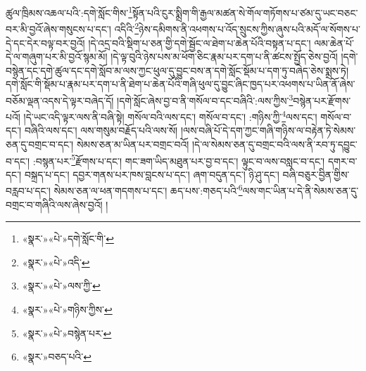 ཚུལ་ཁྲིམས་འཆལ་པའི་:དགེ་སློང་གིས་\footnote{«སྣར་»«པེ་»དགེ་སློང་གི་}སྟོན་པའི་ངུར་སྨྲིག་གི་རྒྱལ་མཚན་སེ་གོལ་གཏོགས་པ་ཙམ་དུ་ཡང་བཅང་བར་མི་བྱའོ་ཞེས་གསུངས་པ་དང་། འདིའི་\footnote{«སྣར་»«པེ་»འདི་}ཉེས་དམིགས་ནི་འཕགས་པ་འོད་སྲུངས་ཀྱིས་ཞུས་པའི་མདོ་ལ་སོགས་པ་དེ་དང་དེར་བལྟ་བར་བྱའོ། །དེ་འདྲ་བའི་སྡིག་པ་ཅན་གྱི་དགེ་སྦྱོང་ལ་ཐེག་པ་ཆེན་པོའི་བསྟན་པ་དང་། ལམ་ཆེན་པོ་དེ་ལ་གཞུག་པར་མི་བྱའོ་སྙམ་མོ། །དེ་ལྟ་བུའི་ཉེས་པས་མ་ཕོག་ཅིང་རྣམ་པར་དག་པ་ནི་ཚངས་སྤྱོད་ཅེས་བྱའོ། །དགེ་བསྙེན་དང་དགེ་ཚུལ་དང་དགེ་སློབ་མ་ལས་ཀྱང་ཕུལ་དུ་བྱུང་བས་ན་དགེ་སློང་སྡོམ་པ་དག་ཏུ་བཞེད་ཅེས་སྨྲས་ཏེ། དགེ་སློང་གི་སྡོམ་པ་རྣམ་པར་དག་པ་ནི་ཐེག་པ་ཆེན་པོའི་གཞི་ཕུལ་དུ་བྱུང་ཞིང་ཁྱད་པར་འཕགས་པ་ཡིན་ནོ་ཞེས་བཅོམ་ལྡན་འདས་དེ་ལྟར་བཞེད་དོ། །དགེ་སློང་ཞེས་བྱ་བ་ནི་གསོལ་བ་དང་བཞིའི་:ལས་ཀྱིས་\footnote{«སྣར་»«པེ་»ལས་ཀྱི་}བསྙེན་པར་རྫོགས་པའོ། །དེ་ཡང་འདི་ལྟར་ལས་ནི་བཞི་སྟེ། གསོལ་བའི་ལས་དང་། གསོལ་བ་དང་། :གཉིས་ཀྱི་\footnote{«སྣར་»«པེ་»གཉིས་ཀྱིས་}ལས་དང་། གསོལ་བ་དང་། བཞིའི་ལས་དང་། ལས་གསུམ་བརྗོད་པའི་ལས་སོ། །ལས་བཞི་པོ་དེ་དག་ཀྱང་གཞི་གཉིས་ལ་བརྟེན་ཏེ་སེམས་ཅན་དུ་བགྲང་བ་དང་། སེམས་ཅན་མ་ཡིན་པར་བགྲང་བའོ། །དེ་ལ་སེམས་ཅན་དུ་བགྲང་བའི་ལས་ནི་རབ་ཏུ་དབྱུང་བ་དང་། :བསྙན་པར་\footnote{«སྣར་»«པེ་»བསྙེན་པར་}རྫོགས་པ་དང་། གང་ཟག་ཡིད་མཐུན་པར་བྱ་བ་དང་། ལྟུང་བ་ལས་བསླང་བ་དང་། དགར་བ་དང་། བསྐྲད་པ་དང་། དབྱར་གནས་པར་ཁས་བླངས་པ་དང་། ཞག་བདུན་དང་། ཉི་ཤུ་དང་། བཞི་བཅུར་བྱིན་གྱིས་བརླབ་པ་དང་། སེམས་ཅན་ལ་ཕན་གདགས་པ་དང་། ཆད་པས་:གཅད་པའི་\footnote{«སྣར་»བཅད་པའི་}ལས་གང་ཡིན་པ་དེ་ནི་སེམས་ཅན་དུ་བགྲང་བ་གཞིའི་ལས་ཞེས་བྱའོ། །
